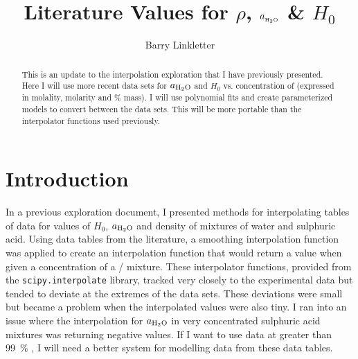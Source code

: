 \documentclass[]{tufte-handout}
\title{Literature Values for $\rho$, $a_{_{\ce{H2O}}}$ \& $H_0$}
\author[Barry Linkletter]{Barry Linkletter}
\date{} %
\begin{document}
\justifying

\maketitle
{}
\begin{abstract}

\noindent This is an update to the interpolation exploration that I have previously presented. Here I will use more recent data sets for $a_{\ce{H2O}}$ and $H_0$ vs. concentration of  (expressed in molality, molarity and \% mass). I will use polynomial fits and create parameterized models to convert between the data sets. This will be more portable than the interpolator functions used previously.

\end{abstract}




\section{Introduction}

In a previous exploration document, I presented methods for interpolating tables of data for values of $H_0$, $a_{\ce{H2O}}$ and density of mixtures of water and sulphuric acid. Using data tables from the literature, a smoothing interpolation function was applied to create an interpolation function that would return a value when given a concentration of a / mixture. These interpolator functions, provided from the \texttt{scipy.interpolate} library, tracked very closely to the experimental data but tended to deviate at the extremes of the data sets. These deviations were small but became a problem when the interpolated values were also tiny. I ran into an issue where the interpolation for $a_{\ce{H2O}}$ in very concentrated sulphuric acid mixtures was returning negative values. If I want to use data at greater than \qty{99}{\percent} , I will need a better system for modelling data from these data tables.
\end{document}

